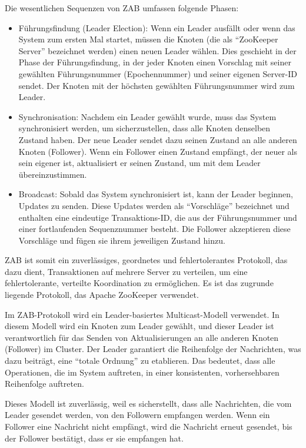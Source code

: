 Die wesentlichen Sequenzen von ZAB umfassen folgende Phasen:
\begin{itemize}
\item Führungsfindung (Leader Election): Wenn ein Leader ausfällt oder wenn das System zum ersten Mal startet, müssen die Knoten (die als \enquote{ZooKeeper Server} bezeichnet werden) einen neuen Leader wählen. Dies geschieht in der Phase der Führungsfindung, in der jeder Knoten einen Vorschlag mit seiner gewählten Führungsnummer (Epochennummer) und seiner eigenen Server-ID sendet. Der Knoten mit der höchsten gewählten Führungsnummer wird zum Leader.
\item Synchronisation: Nachdem ein Leader gewählt wurde, muss das System synchronisiert werden, um sicherzustellen, dass alle Knoten denselben Zustand haben. Der neue Leader sendet dazu seinen Zustand an alle anderen Knoten (Follower). Wenn ein Follower einen Zustand empfängt, der neuer als sein eigener ist, aktualisiert er seinen Zustand, um mit dem Leader übereinzustimmen.
\item Broadcast: Sobald das System synchronisiert ist, kann der Leader beginnen, Updates zu senden. Diese Updates werden als \enquote{Vorschläge} bezeichnet und enthalten eine eindeutige Transaktions-ID, die aus der Führungsnummer und einer fortlaufenden Sequenznummer besteht. Die Follower akzeptieren diese Vorschläge und fügen sie ihrem jeweiligen Zustand hinzu.
\end{itemize}

ZAB  ist somit  ein zuverlässiges, geordnetes und fehlertolerantes Protokoll, das dazu dient, Transaktionen auf mehrere Server zu verteilen, um eine fehlertolerante, verteilte Koordination zu ermöglichen. Es ist das zugrunde liegende Protokoll, das Apache ZooKeeper verwendet.

Im ZAB-Protokoll wird ein Leader-basiertes Multicast-Modell verwendet. In diesem Modell wird ein Knoten zum Leader gewählt, und dieser Leader ist verantwortlich für das Senden von Aktualisierungen an alle anderen Knoten (Follower) im Cluster. Der Leader garantiert die Reihenfolge der Nachrichten, was dazu beiträgt, eine \enquote{totale Ordnung} zu etablieren. Das bedeutet, dass alle Operationen, die im System auftreten, in einer konsistenten, vorhersehbaren Reihenfolge auftreten.

Dieses Modell ist zuverlässig, weil es sicherstellt, dass alle Nachrichten, die vom Leader gesendet werden, von den Followern empfangen werden. Wenn ein Follower eine Nachricht nicht empfängt, wird die Nachricht erneut gesendet, bis der Follower bestätigt, dass er sie empfangen hat.

